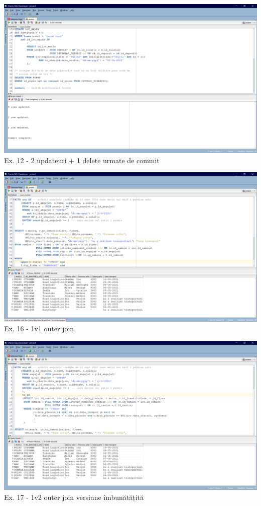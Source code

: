 \documentclass[12pt, a4paper]{article}
\begin{document}
\includegraphics[width=\textwidth]{ex12.png}
\label{Ex12}
\centering Ex. 12 - 2 updateuri + 1 delete urmate de commit

\includegraphics[width=\textwidth]{outer_join_1.png}
\label{Ex16 1-1}
\centering Ex. 16 - 1v1 outer join

\includegraphics[width=\textwidth]{outer_join_2.png}
\label{Ex16 1-2}
\centering Ex. 17 - 1v2 outer join versiune îmbunătățită
\end{document}
